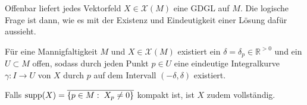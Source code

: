 \documentclass[../H_Analysis_main.tex]{subfiles}
\begin{document}
Offenbar liefert jedes Vektorfeld $X \in \mathcal{X}(M)$ eine GDGL auf $M$. Die logische Frage ist dann, wie es mit der Existenz und Eindeutigkeit einer Lösung dafür aussieht.
\begin{satz}\label{satz:exloesgdglmf}
Für eine Mannigfaltigkeit $M$ und $X \in \mathcal{X}(M)$ existiert ein $\delta = \delta_p \in \mathbb{R}^{> 0}$ und ein $U \subset M$ offen, sodass durch jeden Punkt $p \in U$ eine eindeutige Integralkurve $\gamma: I \rightarrow U$ von $X$ durch $p$ auf dem Intervall $(-\delta, \delta)$ existiert.

Falls $\text{supp}(X) = \overline{\qty{p \in M: \; X_p \neq 0}}$ kompakt ist, ist $X$ zudem vollständig.
\end{satz}



\end{document}
